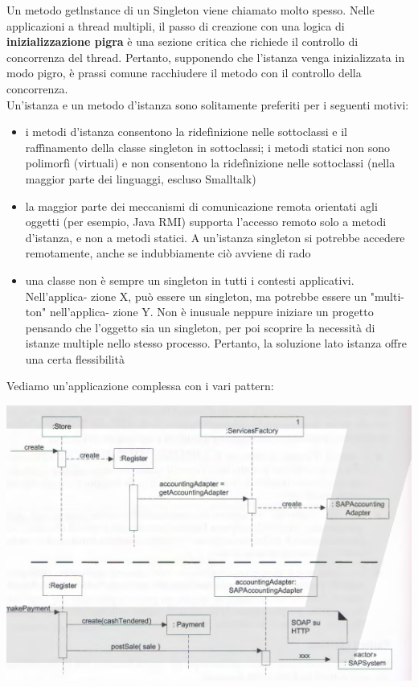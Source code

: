 \documentclass[a4paper,12pt, oneside]{book}
\begin{document}
Un metodo getlnstance di un Singleton viene chiamato molto spesso. Nelle applicazioni
a thread multipli, il passo di creazione con una logica di \textbf{inizializzazione pigra} è una
sezione critica che richiede il controllo di concorrenza del thread. Pertanto, supponendo
che l'istanza venga inizializzata in modo pigro, è prassi comune racchiudere il metodo
con il controllo della concorrenza.\\
Un'istanza e un metodo d'istanza sono solitamente preferiti per i seguenti motivi:
\begin{itemize}
\item i metodi d'istanza consentono la ridefìnizione nelle sottoclassi e il raffìnamento
della classe singleton in sottoclassi; i metodi statici non sono polimorfì (virtuali) e
non consentono la ridefìnizione nelle sottoclassi (nella maggior parte dei linguaggi,
escluso Smalltalk)
\item la maggior parte dei meccanismi di comunicazione remota orientati agli oggetti
(per esempio, Java RMI) supporta l'accesso remoto solo a metodi d'istanza, e non
a metodi statici. A un'istanza singleton si potrebbe accedere remotamente, anche se
indubbiamente ciò avviene di rado
\item una classe non è sempre un singleton in tutti i contesti applicativi. Nell'applica-
zione X, può essere un singleton, ma potrebbe essere un "multi-ton" nell'applica-
zione Y. Non è inusuale neppure iniziare un progetto pensando che l'oggetto sia
un singleton, per poi scoprire la necessità di istanze multiple nello stesso processo.
Pertanto, la soluzione lato istanza offre una certa flessibilità
\end{itemize}
Vediamo un'applicazione complessa con i vari pattern:
\begin{center}
\includegraphics[scale = 0.7]{img/gof10.png}
\end{center}
\end{document}
